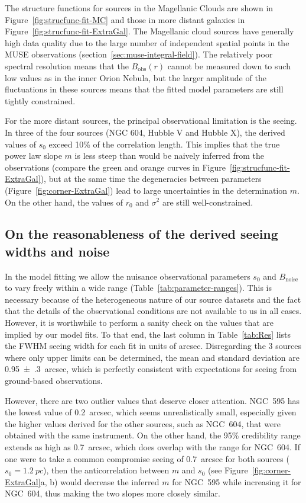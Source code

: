 \documentclass[fleqn,usenatbib, useAMS, a4paper]{mnras}
\newcommand\noise{\ensuremath{_{\text{noise}}}}
\newcommand\obs{\ensuremath{_{\mathrm{obs}}}}
\begin{document}
The structure functions for sources in the Magellanic Clouds are shown in Figure~\ref{fig:strucfunc-fit-MC}
and those in more distant galaxies in Figure~\ref{fig:strucfunc-fit-ExtraGal}.
The Magellanic cloud sources have generally high data quality due to the
large number of independent spatial points in the MUSE observations
(section~\ref{sec:muse-integral-field}).
The relatively poor spectral resolution means that the \(B\obs(r)\) cannot
be measured down to such low values as in the inner Orion Nebula,
but the larger amplitude of the fluctuations in these sources means
that the fitted model parameters are still tightly constrained.

For the more distant sources, the principal observational limitation is the seeing.
In three of the four sources (NGC 604, Hubble V and Hubble X),
the derived values of \(s_0\) exceed 10\% of the correlation length.
This implies that the true power law slope \(m\) is less steep than
would be naively inferred from the observations
(compare the green and orange curves in Figure~\ref{fig:strucfunc-fit-ExtraGal}),
but at the same time the degeneracies between parameters
(Figure~\ref{fig:corner-ExtraGal})
lead to large uncertainties in the determination \(m\).
On the other hand, the values of \(r_0\) and \(\sigma^2\) are still well-constrained.

\subsection{On the reasonableness of the derived seeing widths and noise}
\label{sec:sanity-check-derived}
In the model fitting we allow the nuisance observational parameters
\(s_0\) and \(B\noise\) to vary freely within a wide range
(Table~\ref{tab:parameter-ranges}).
This is necessary because of the heterogeneous nature of our source datasets
and the fact that the details of the observational conditions
are not available to us in all cases.
However, it is worthwhile to perform a sanity check on the values that are implied by our model fits.
To that end, the last column in Table~\ref{tab:Res} lists the FWHM seeing width for each fit in units of arcsec.
Disregarding the 3 sources where only upper limits can be determined,
the mean and standard deviation are \SI{0.95(30)}{arcsec},
which is perfectly consistent with expectations for seeing from ground-based observations.

However, there are two outlier values that deserve closer attention.
NGC~595 has the lowest value of \SI{0.2}{arcsec}, which seems
unrealistically small, especially given the higher values
derived for the other sources, such as NGC~604,
that were obtained with the same instrument.
On the other hand, the 95\% credibility range extends as high as \SI{0.7}{arcsec},
which does overlap with the range for NGC~604.
If one were to take a common compromise seeing of \SI{0.7}{arcsec}
for both sources (\(s_0 = \SI{1.2}{pc}\)),
then the anticorrelation between \(m\) and \(s_0\)
(see Figure~\ref{fig:corner-ExtraGal}a, b)
would decrease the inferred \(m\) for NGC~595 while increasing it for NGC~604,
thus making the two slopes more closely similar. 
\end{document}
